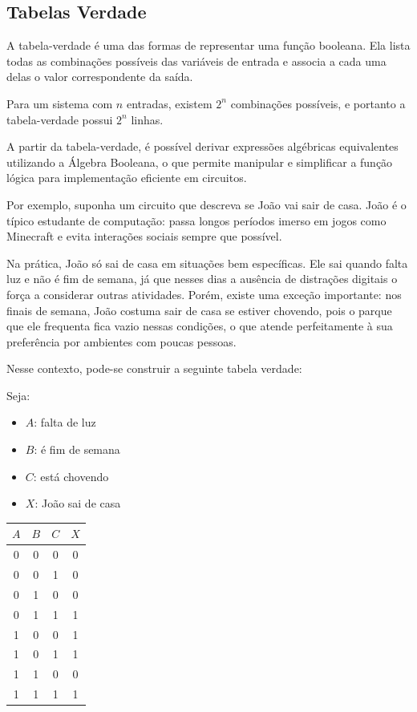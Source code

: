 \subsection{Tabelas Verdade}
\label{sec:karnaugh}

A tabela-verdade é uma das formas de representar uma função booleana. Ela lista todas as combinações possíveis das variáveis de entrada e associa a cada uma delas o valor correspondente da saída.

Para um sistema com $n$ entradas, existem $2^n$ combinações possíveis, e portanto a tabela-verdade possui $2^n$ linhas.

A partir da tabela-verdade, é possível derivar expressões algébricas equivalentes utilizando a Álgebra Booleana, o que permite manipular e simplificar a função lógica para implementação eficiente em circuitos.

Por exemplo, suponha um circuito que descreva se João vai sair de casa. João é o típico estudante de computação: passa longos períodos imerso em jogos como Minecraft e evita interações sociais sempre que possível.

Na prática, João só sai de casa em situações bem específicas. Ele sai quando falta luz e não é fim de semana, já que nesses dias a ausência de distrações digitais o força a considerar outras atividades. Porém, existe uma exceção importante: nos finais de semana, João costuma sair de casa se estiver chovendo, pois o parque que ele frequenta fica vazio nessas condições, o que atende perfeitamente à sua preferência por ambientes com poucas pessoas.

Nesse contexto, pode-se construir a seguinte tabela verdade:

Seja: \\
\begin{itemize}
    \item $A$: falta de luz
    \item $B$: é fim de semana
    \item $C$: está chovendo
    \item $X$: João sai de casa
\end{itemize}

\begin{center}
\begin{tabular}{ccc|c}
$A$ & $B$ & $C$ & $X$ \\
\hline
0 & 0 & 0 & 0 \\
0 & 0 & 1 & 0 \\
0 & 1 & 0 & 0 \\
0 & 1 & 1 & 1 \\
1 & 0 & 0 & 1 \\
1 & 0 & 1 & 1 \\
1 & 1 & 0 & 0 \\
1 & 1 & 1 & 1 \\
\end{tabular}
\end{center}

